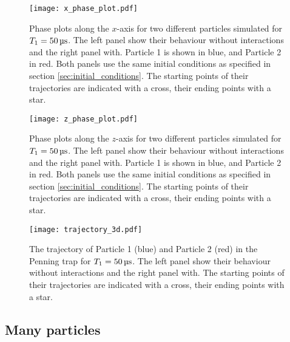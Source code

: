 \begin{figure}
    \texttt{[image: x\_phase\_plot.pdf]}
    \caption{Phase plots along the $x$-axis for two different particles simulated for $T_1=50\,\mus$. The left panel show their behaviour without interactions and the right panel with. Particle 1 is shown in blue, and Particle 2 in red. Both panels use the same initial conditions as specified in section \ref{sec:initial_conditions}. The starting points of their trajectories are indicated with a cross, their ending points with a star.}
    \label{fig:x_phase_two_particles}
\end{figure} 

\begin{figure}
    \texttt{[image: z\_phase\_plot.pdf]}
    \caption{Phase plots along the $z$-axis for two different particles simulated for $T_1=50\,\mus$. The left panel show their behaviour without interactions and the right panel with. Particle 1 is shown in blue, and Particle 2 in red. Both panels use the same initial conditions as specified in section \ref{sec:initial_conditions}. The starting points of their trajectories are indicated with a cross, their ending points with a star.}
    \label{fig:z_phase_two_particles}
\end{figure}

\begin{figure}
    \texttt{[image: trajectory\_3d.pdf]}
    \caption{The trajectory of Particle 1 (blue) and Particle 2 (red) in the Penning trap for $T_1=50\,\mus$. The left panel show their behaviour without interactions and the right panel with. The starting points of their trajectories are indicated with a cross, their ending points with a star.}
    \label{fig:3d_trajectory}
\end{figure}
\twocolumngrid





\subsection{Many particles}\label{sec:many_particles}

